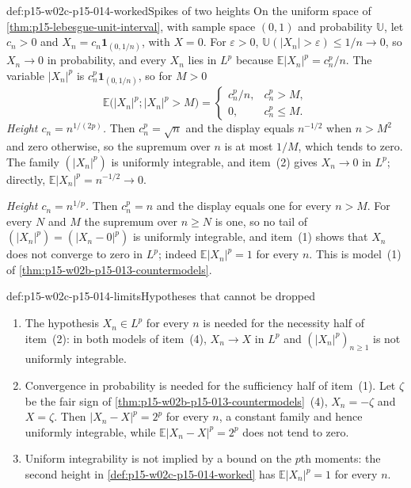 \begin{hbexample}{def:p15-w02c-p15-014-worked}{Spikes of two heights}
On the uniform space of \cref{thm:p15-lebesgue-unit-interval}, with
sample space \((0,1)\) and probability \(\mathbb U\), let
\(c_n>0\) and \(X_n=c_n\mathbf1_{(0,1/n)}\), with \(X=0\). For
\(\varepsilon>0\), \(\mathbb U(|X_n|>\varepsilon)\leq1/n\to0\), so
\(X_n\to0\) in probability, and every \(X_n\) lies in \(L^p\) because
\(\mathbb E|X_n|^p=c_n^p/n\). The variable \(|X_n|^p\) is
\(c_n^p\mathbf1_{(0,1/n)}\), so for \(M>0\)
\[
 \mathbb E\bigl(|X_n|^p;|X_n|^p>M\bigr)=
 \begin{cases} c_n^p/n,& c_n^p>M,\\ 0,& c_n^p\leq M.\end{cases}
\]
\emph{Height \(c_n=n^{1/(2p)}\).} Then \(c_n^p=\sqrt n\) and the
display equals \(n^{-1/2}\) when \(n>M^2\) and zero otherwise, so the
supremum over \(n\) is at most \(1/M\), which tends to zero. The family
\((|X_n|^p)\) is uniformly integrable, and item~(2) gives
\(X_n\to0\) in \(L^p\); directly,
\(\mathbb E|X_n|^p=n^{-1/2}\to0\).

\emph{Height \(c_n=n^{1/p}\).} Then \(c_n^p=n\) and the display equals
one for every \(n>M\). For every \(N\) and \(M\) the supremum over
\(n\geq N\) is one, so no tail of \((|X_n|^p)=(|X_n-0|^p)\) is
uniformly integrable, and item~(1) shows that \(X_n\) does not converge
to zero in \(L^p\); indeed \(\mathbb E|X_n|^p=1\) for every \(n\). This
is model~(1) of \cref{thm:p15-w02b-p15-013-countermodels}.
\end{hbexample}

\begin{hbwarning}{def:p15-w02c-p15-014-limits}{Hypotheses that cannot be dropped}
\begin{enumerate}
\item The hypothesis \(X_n\in L^p\) for every \(n\) is needed for the
      necessity half of item~(2): in both models of item~(4),
      \(X_n\to X\) in \(L^p\) and \((|X_n|^p)_{n\geq1}\) is not
      uniformly integrable.
\item Convergence in probability is needed for the sufficiency half of
      item~(1). Let \(\zeta\) be the fair sign of
      \cref{thm:p15-w02b-p15-013-countermodels}~(4), \(X_n=-\zeta\) and
      \(X=\zeta\). Then \(|X_n-X|^p=2^p\) for every \(n\), a constant
      family and hence uniformly integrable, while
      \(\mathbb E|X_n-X|^p=2^p\) does not tend to zero.
\item Uniform integrability is not implied by a bound on the \(p\)th
      moments: the second height in
      \cref{def:p15-w02c-p15-014-worked} has
      \(\mathbb E|X_n|^p=1\) for every \(n\).
\end{enumerate}
\end{hbwarning}


